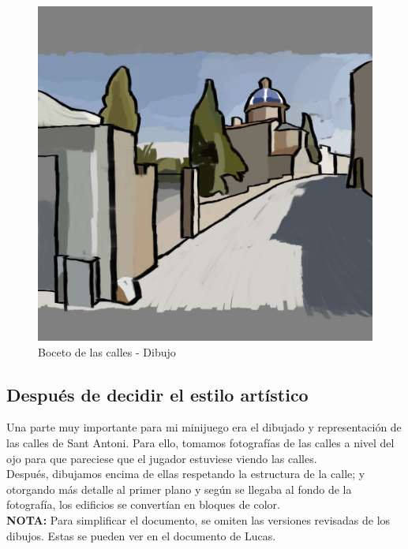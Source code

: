 \documentclass[12pt]{article}
\begin{document}
\begin{figure}[H]
\begin{minipage}[b]{0.45\textwidth}
                \centering
                \includegraphics[width=\textwidth]{imgs/escenario_minijuego.png}
                \caption{Boceto de las calles - Dibujo}
                \label{fig:calle_boceto_dibujo}
            \end{minipage}
        \end{figure}
    \subsection{Después de decidir el estilo artístico}
    Una parte muy importante para mi minijuego era el dibujado y representación de las calles de Sant Antoni. Para ello, tomamos fotografías de las calles a nivel del ojo para que pareciese que el jugador estuviese viendo las calles.\\
    Después, dibujamos encima de ellas respetando la estructura de la calle; y otorgando más detalle al primer plano y según se llegaba al fondo de la fotografía, los edificios se convertían en bloques de color.\\
    \textbf{NOTA:} Para simplificar el documento, se omiten las versiones revisadas de los dibujos. Estas se pueden ver en el documento de Lucas.
\end{document}
